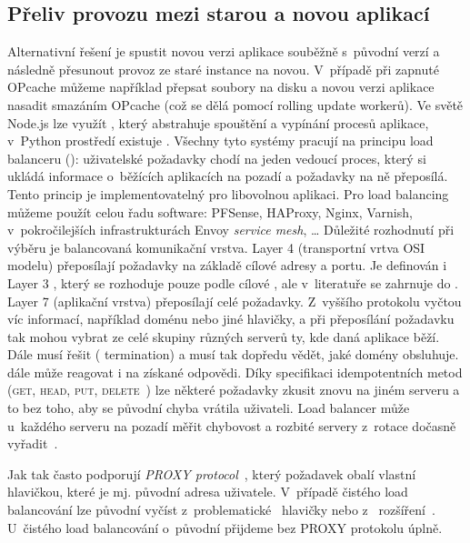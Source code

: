         \subsection{Přeliv provozu mezi starou a novou aplikací}
            \label{deploy-v-jedne-instanci}
            Alternativní řešení je spustit novou verzi aplikace souběžně s~původní verzí a následně přesunout provoz ze staré instance na novou. V~případě  při zapnuté OPcache můžeme například přepsat soubory na disku a novou verzi aplikace nasadit smazáním OPcache (což se dělá pomocí rolling update  workerů). Ve světě Node.js lze využít , který abstrahuje spouštění a vypínání procesů aplikace, v~Python prostředí existuje . Všechny tyto systémy pracují na principu load balanceru (): uživatelské požadavky chodí na jeden vedoucí proces, který si ukládá informace o~běžících aplikacích na pozadí a požadavky na ně přeposílá. Tento princip je implementovatelný pro libovolnou aplikaci. Pro load balancing můžeme použít celou řadu software: PFSense, HAProxy, Nginx, Varnish, v~pokročilejších infrastrukturách Envoy \textit{service mesh}, … Důležité rozhodnutí při výběru  je balancovaná komunikační vrstva. Layer 4 (transportní vrtva OSI modelu)  přeposílají  požadavky na základě cílové  adresy a portu. Je definován i Layer 3 , který se rozhoduje pouze podle cílové , ale v~literatuře se zahrnuje do . Layer 7 (aplikační vrstva)  přeposílají celé \HTTP požadavky. Z~vyššího protokolu vyčtou víc informací, například doménu nebo jiné hlavičky, a při přeposílání požadavku tak mohou vybrat ze celé skupiny různých serverů ty, kde daná aplikace běží. Dále   musí řešit  ( termination) a musí tak dopředu vědět, jaké domény obsluhuje.   dále může reagovat i na získané \HTTP odpovědi. Díky \HTTP specifikaci idempotentních metod (\textsc{get}, \textsc{head}, \textsc{put}, \textsc{delete}~\cite{http-idempotent}) lze některé požadavky zkusit znovu na jiném serveru a to bez toho, aby se původní chyba vrátila uživateli. Load balancer může u~každého serveru na pozadí měřit chybovost a rozbité servery z~rotace dočasně vyřadit~\cite{nginx-circuit-breaker}.

            Jak  tak   často podporují \textit{PROXY protocol}~\cite{tarreau-proxyprotocol}, který požadavek obalí vlastní hlavičkou, které je mj. původní  adresa uživatele. V~případě čistého  load balancování lze původní  vyčíst z~problematické~\cite{hansen-xforwardedfor} hlavičky  nebo z~ rozšíření~\cite{http-forwarded}. U~čistého  load balancování o~původní  přijdeme bez PROXY protokolu úplně.

